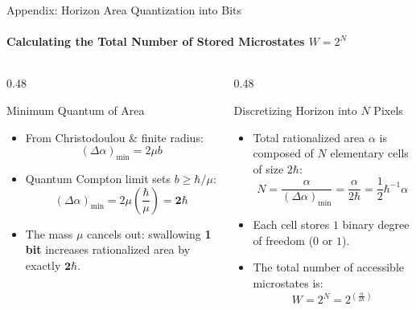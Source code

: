 \documentclass[aspectratio=169]{beamer}
\begin{document}
\begin{frame}{Appendix: Horizon Area Quantization into Bits}
\framesubtitle{Calculating the Total Number of Stored Microstates $W = 2^N$}

\begin{columns}[T]
  \begin{column}{0.48\textwidth}
    \begin{block}{Minimum Quantum of Area}
    \begin{itemize}
      \item From Christodoulou \& finite radius:
      \[
        (\Delta \alpha)_{\text{min}} = 2\mu b
      \]
      \item Quantum Compton limit sets $b \ge \hbar/\mu$:
      \[
        (\Delta \alpha)_{\text{min}} = 2\mu \left(\frac{\hbar}{\mu}\right) = \mathbf{2\hbar}
      \]
      \item The mass $\mu$ cancels out: swallowing \textbf{1 bit} increases rationalized area by exactly $\mathbf{2\hbar}$.
    \end{itemize}
    \end{block}
  \end{column}

  \begin{column}{0.48\textwidth}
    \begin{block}{Discretizing Horizon into $N$ Pixels}
    \begin{itemize}
      \item Total rationalized area $\alpha$ is composed of $N$ elementary cells of size $2\hbar$:
      \[
        N = \frac{\alpha}{(\Delta \alpha)_{\text{min}}} = \frac{\alpha}{2\hbar} = \frac{1}{2} \hbar^{-1} \alpha
      \]
      \item Each cell stores $1$ binary degree of freedom ($0$ or $1$).
      \item The total number of accessible microstates is:
      \[
        W = 2^N = 2^{\left(\frac{\alpha}{2\hbar}\right)}
      \]
    \end{itemize}
    \end{block}
  \end{column}
\end{columns}
\end{frame}
\end{document}
